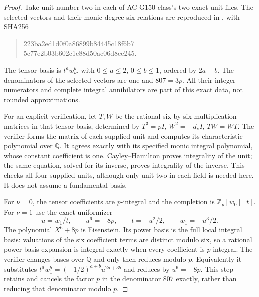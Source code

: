 \begin{proof}
Take unit number two in each of AC-G150-class's two exact unit
files.  The selected vectors and their monic degree-six relations
are reproduced in , with SHA256
\begin{quote}\ttfamily\small
223ba2ed1d0f0a86899b84445c18f6b7\\
5c77e2b03b602c1c88d50ac06d8ce245.
\end{quote}
The tensor basis is $t^a w_\nu^b$, with $0\leq a\leq2$,
$0\leq b\leq1$, ordered by $2a+b$.
The denominators of the selected vectors are one and $807=3p$.
All their integer numerators and complete integral annihilators
are part of this exact data, not rounded approximations.

For an explicit verification, let $T,W$ be the rational six-by-six
multiplication matrices in that tensor basis, determined by
$T^3=pI$, $W^2=-d_\nu I$, $TW=WT$.
The verifier forms the matrix of each supplied unit and computes
its characteristic polynomial over $\mathbb Q$.
It agrees exactly with its specified monic integral polynomial,
whose constant coefficient is one.
Cayley--Hamilton proves integrality of the unit; the same equation,
solved for its inverse, proves integrality of the inverse.
This checks all four supplied units, although only unit two in
each field is needed here.  It does not assume a fundamental basis.

For $\nu=0$, the tensor coefficients are $p$-integral and the
completion is $\mathbb Z_p[w_0][t]$.
For $\nu=1$ use the exact uniformizer
\[
 u=w_1/t,\qquad u^6=-8p,\qquad
 t=-u^2/2,\qquad w_1=-u^3/2.
 \tag{Q8N.10}
\]
The polynomial $X^6+8p$ is Eisenstein.
Its power basis is the full local integral basis: valuations of
the six coefficient terms are distinct modulo six, so a rational
power-basis expansion is integral exactly when every coefficient
is $p$-integral.
The verifier changes bases over $\mathbb Q$ and only then reduces
modulo $p$.  Equivalently it substitutes
$t^aw_1^b=(-1/2)^{a+b}u^{2a+3b}$ and reduces by $u^6=-8p$.
This step retains and cancels the factor $p$ in the denominator
$807$ exactly, rather than reducing that denominator modulo $p$.


\end{proof}

